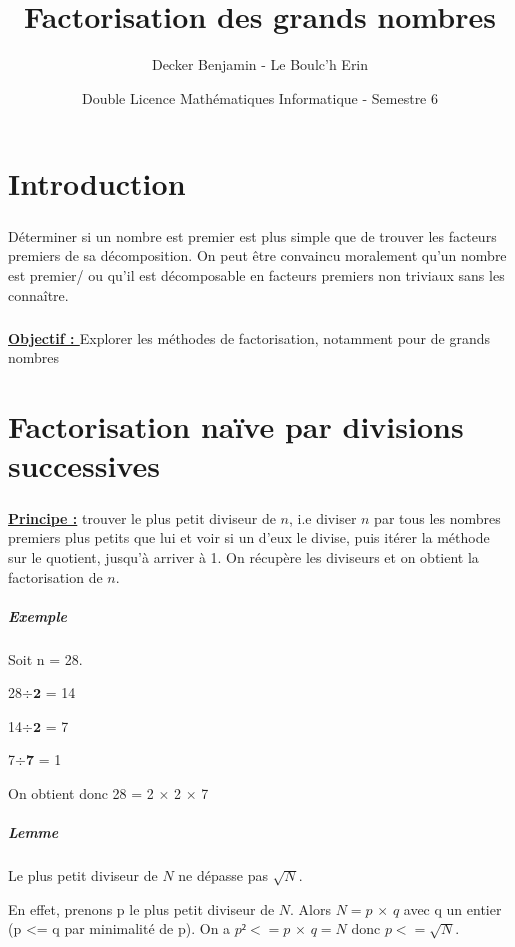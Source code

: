 \documentclass[11pt,a4paper]{article}
\begin{document}
	
	\title{Factorisation des grands nombres} 
	\author{Decker Benjamin - Le Boulc'h Erin}
	\date{Double Licence Mathématiques Informatique - Semestre 6}
	\maketitle
	\newpage
	
	\renewcommand*\contentsname{Sommaire}
	\tableofcontents
	\newpage
	
	\section{\LARGE{Introduction}}
	\subparagraph{}
	Déterminer si un nombre est premier est plus simple que de trouver les facteurs premiers de sa décomposition. On peut être convaincu moralement qu’un nombre est premier/ ou qu’il est décomposable en facteurs premiers non triviaux sans les connaître. 
	
	\subparagraph{}
	\textbf{\underline{Objectif : }}Explorer les méthodes de factorisation, notamment pour de grands nombres
	\newpage
		
	\section{\LARGE{Factorisation naïve par divisions successives}}
		\subparagraph{}
	\textbf{\underline{Principe :}} trouver le plus petit diviseur de  $\mathit{n}$, i.e diviser  $\mathit{n}$ par tous les nombres premiers plus petits que lui et voir si un d’eux le divise, puis itérer la méthode sur le quotient, jusqu'à arriver à 1. On récupère les diviseurs et on obtient la factorisation de $\mathit{n}$.
	
		\subparagraph{Exemple}
		Soit n = 28.
		
			28$\div$$\mathbf{2}$ = 14
			
			14$\div$$\mathbf{2}$ = 7
			
			7$\div$$\mathbf{7}$ = 1
			
		On obtient donc 28 = 2 $\times$ 2 $\times$ 7
		
		\subparagraph{Lemme}
		
		Le plus petit diviseur de $\mathit{N}$ ne dépasse pas $\sqrt{N}$.
		
		En effet, prenons p le plus petit diviseur de $\mathit{N}$. Alors $\mathit{N = p}$ $\times$ $\mathit{q}$  avec q un entier (p <= q par minimalité de p). On a $\mathit{p² <= p}$ $\times$ $\mathit{q = N}$ donc $\mathit{p <= }$$\sqrt{N}$. 
		
\end{document}

